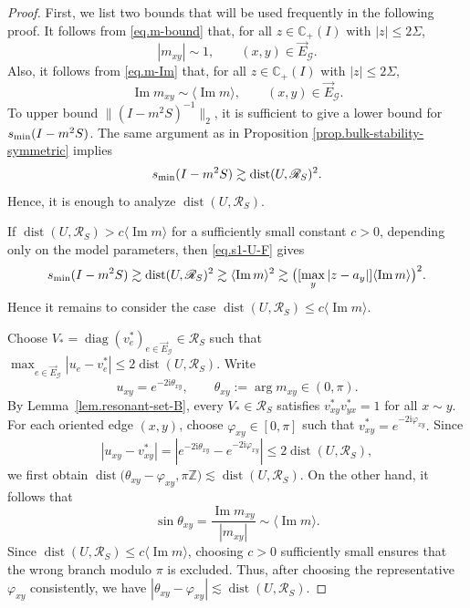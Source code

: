 \documentclass[11pt,twoside, a4paper]{article}
\numberwithin{equation}{section}
\numberwithin{figure}{section}
\theoremstyle{plain} %
\theoremstyle{definition}
\theoremstyle{remark}
\newcommand{\1} {\mspace{1 mu}}
\newcommand{\2} {\mspace{2 mu}}
\newcommand{\Cp} {\mathbb {C}_+}
\DeclareMathOperator{\im}{Im}
\DeclareMathOperator{\dist}{dist}
\DeclareMathOperator{\diag}{diag}
\begin{document}
\begin{proof}
     First, we list two bounds that will be used frequently in the following proof. It follows from \eqref{eq.m-bound} that, for all $z\in\Cp(I)$ with $|z|\le 2\Sigma$, 
    \begin{equation}\label{eq.m-bulk-bound}
      |m_{xy}|\sim 1,\qquad (x,y)\in\vec E_{\mathcal G}.
    \end{equation}
    Also, it follows from \eqref{eq.m-Im} that, for all $z\in\Cp(I)$ with $|z|\le 2\Sigma$,
    \begin{equation}\label{eq.im-m-comparability}
       \im m_{xy}\sim\langle \im m\rangle,\qquad(x,y)\in\vec E_{\mathcal G}.
    \end{equation}
    To upper bound $\|(I-m^2S)^{-1}\|_2$, it is sufficient to give a lower bound for $s_{\rm min}(I-m^2S)$.
    The same argument as in Proposition \ref{prop.bulk-stability-symmetric} implies 
    \begin{equation}\label{eq.s1-U-F}
      s_{\rm min}(I-m^2S)\gtrsim \dist(U,\mathscr{R}_S)^2.
    \end{equation}
    Hence, it is enough to analyze $\dist(U,\mathscr{R}_S)$.

    
If
$
    \dist(U,\mathscr{R}_S)>c\langle\im m\rangle
$
for a sufficiently small constant \(c>0\), depending only on the model parameters,
then \eqref{eq.s1-U-F} gives
\begin{equation}\label{eq.big-im-case}
    s_{\rm min}(I-m^2S)
    \gtrsim
    \dist(U,\mathscr{R}_S)^2
    \gtrsim
    \langle\im m\rangle^2
    \gtrsim
    \bigl([\max_y |z-a_y|]\langle\im m\rangle\bigr)^2.
\end{equation}
Hence it remains to consider the case
$
    \dist(U,\mathscr{R}_S)\le c\langle\im m\rangle.
$

Choose \(V_*=\diag(v^*_e)_{e\in\vec E_{\mathcal G}}\in\mathscr R_S\) such that
$
    \max_{e\in\vec E_{\mathcal G}}|u_e-v^*_e|\le 2\dist(U,\mathscr{R}_S) .
$
Write
\[
    u_{xy}=e^{-2\mathrm i\theta_{xy}},
    \qquad
    \theta_{xy}:=\arg m_{xy}\in(0,\pi).
\]
By Lemma~\ref{lem.resonant-set-B}, every \(V_*\in\mathscr R_S\) satisfies
$
    v^*_{xy}v^*_{yx}=1
$
for all
$
 x\sim y.
$
For each oriented edge \((x,y)\), 
\smallskip
choose \(\varphi_{xy}\in[0,\pi]\) such that
$
    v^*_{xy}=e^{-2\mathrm i\varphi_{xy}} .
$
Since
\[
    |u_{xy}-v^*_{xy}|
    =
    |e^{-2\mathrm i\theta_{xy}}-e^{-2\mathrm i\varphi_{xy}}|
    \le 2\dist(U,\mathscr{R}_S),
\]
we first obtain
$
    \dist\bigl(\theta_{xy}-\varphi_{xy},\pi\mathbb Z\bigr)
    \lesssim \dist(U,\mathscr{R}_S) .
$
On the other hand, it follows that
\[
    \sin\theta_{xy}
    =
    \frac{\im m_{xy}}{|m_{xy}|}
    \sim
    \langle\im m\rangle .
\]
Since \(\dist(U,\mathscr{R}_S)\le c\langle\im m\rangle\), choosing \(c>0\) sufficiently small ensures that the wrong branch modulo \(\pi\) is excluded. Thus, after choosing the representative \(\varphi_{xy}\) consistently, we have
$
    |\theta_{xy}-\varphi_{xy}|
    \lesssim \dist(U,\mathscr{R}_S) .
$


\end{proof}
\end{document}
